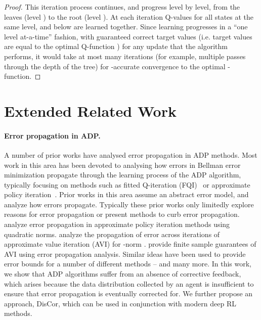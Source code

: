 \documentclass[jmlr]{article}
\begin{document}
\begin{proof}
This iteration process continues, and progress level by level, from the leaves (level ) to the root (level ). At each iteration Q-values for all states at the same level, and below are learned together. Since learning progresses in a ``one level at-a-time'' fashion, with guaranteed correct target values (i.e. target values are equal to the optimal Q-function ) for any update that the algorithm performs, it would take at most  many iterations (for example, multiple passes through the depth of the tree) for -accurate convergence to the optimal -function.
\end{proof}

\section{Extended Related Work}
\label{app:related_work_extended}

\paragraph{Error propagation in ADP.} A number of prior works have analysed error propagation in ADP methods. Most work in this area has been devoted to analysing how errors in Bellman error minimization propagate through the learning process of the ADP algorithm, typically focusing on methods such as fitted Q-iteration (FQI)~\citep{Riedmiller2005} or approximate policy iteration~\citep{perkins2002api}. Prior works in this area assume an abstract error model, and analyze how errors propagate. Typically these prior works only limitedly explore reasons for error propagation or present methods to curb error propagation. \cite{munos2003api} analyze error propagation in approximate policy iteration methods using quadratic norms. \cite{munos2005error} analyze the propagation of error across iterations of approximate value iteration (AVI) for -norm . \cite{munos2008finite} provide finite sample guarantees of AVI using error propagation analysis. Similar ideas have been used to provide error bounds for a number of different methods -- \cite{farahmand2010error,scherrer15a,Lesner2013TightPB,scherrer_comparison} and many more. In this work, we show that ADP algorithms suffer from an absence of corrective feedback, which arises because the data distribution collected by an agent is insufficient to ensure that error propagation is eventually corrected for. We further propose an approach, DisCor, which can be used in conjunction with modern deep RL methods. 
\end{document}
